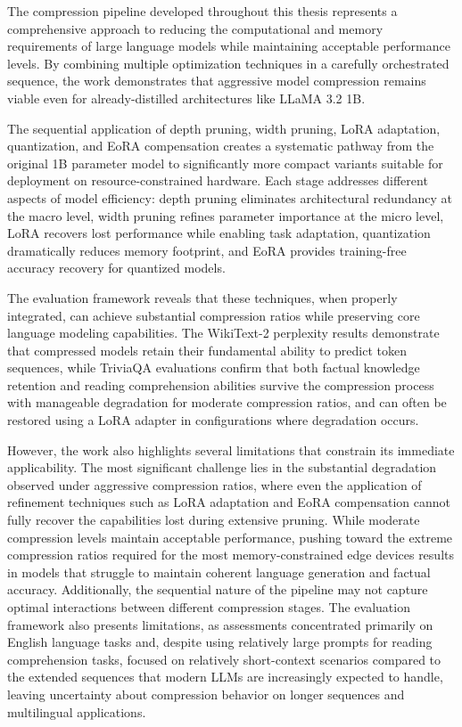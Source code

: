 
The compression pipeline developed throughout this thesis represents a comprehensive approach to reducing the computational and memory requirements of large language models while maintaining acceptable performance levels. By combining multiple optimization techniques in a carefully orchestrated sequence, the work demonstrates that aggressive model compression remains viable even for already-distilled architectures like LLaMA 3.2 1B.

The sequential application of depth pruning, width pruning, LoRA adaptation, quantization, and EoRA compensation creates a systematic pathway from the original 1B parameter model to significantly more compact variants suitable for deployment on resource-constrained hardware. Each stage addresses different aspects of model efficiency: depth pruning eliminates architectural redundancy at the macro level, width pruning refines parameter importance at the micro level, LoRA recovers lost performance while enabling task adaptation, quantization dramatically reduces memory footprint, and EoRA provides training-free accuracy recovery for quantized models.

The evaluation framework reveals that these techniques, when properly integrated, can achieve substantial compression ratios while preserving core language modeling capabilities. The WikiText-2 perplexity results demonstrate that compressed models retain their fundamental ability to predict token sequences, while TriviaQA evaluations confirm that both factual knowledge retention and reading comprehension abilities survive the compression process with manageable degradation for moderate compression ratios, and can often be restored using a LoRA adapter in configurations where degradation occurs.

However, the work also highlights several limitations that constrain its immediate applicability. The most significant challenge lies in the substantial degradation observed under aggressive compression ratios, where even the application of refinement techniques such as LoRA adaptation and EoRA compensation cannot fully recover the capabilities lost during extensive pruning. While moderate compression levels maintain acceptable performance, pushing toward the extreme compression ratios required for the most memory-constrained edge devices results in models that struggle to maintain coherent language generation and factual accuracy. Additionally, the sequential nature of the pipeline may not capture optimal interactions between different compression stages. The evaluation framework also presents limitations, as assessments concentrated primarily on English language tasks and, despite using relatively large prompts for reading comprehension tasks, focused on relatively short-context scenarios compared to the extended sequences that modern LLMs are increasingly expected to handle, leaving uncertainty about compression behavior on longer sequences and multilingual applications.

